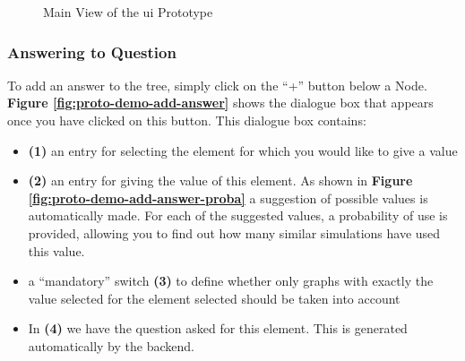     \begin{figure}[h]
    \centering
    \caption{\label{fig:proto-demo}  Main View of the \acrshort{ui} Prototype}
    \end{figure}
    
    
    \subsubsection{Answering to Question}
    To add an answer to the tree, simply click on the “+” button below a Node. \textbf{Figure \ref{fig:proto-demo-add-answer}} shows the dialogue box that appears once you have clicked on this button. This dialogue box contains:
    
    \begin{itemize}
        \item \textbf{(1)} an entry for selecting the element for which you would like to give a value
        \item \textbf{(2)} an entry for giving the value of this element. As shown in \textbf{Figure \ref{fig:proto-demo-add-answer-proba}} a suggestion of possible values is automatically made. For each of the suggested values, a probability of use is provided, allowing you to find out how many similar simulations have used this value.
        \item a “mandatory” switch \textbf{(3)} to define whether only graphs with exactly the value selected for the element selected should be taken into account
        \item In \textbf{(4)} we have the question asked for this element. This is generated automatically by the backend.
    \end{itemize}
    

